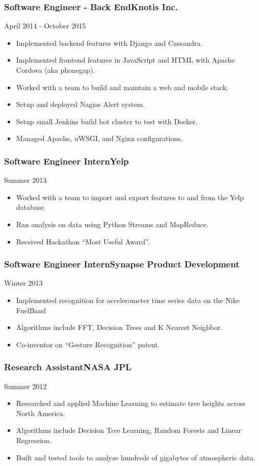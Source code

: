 \documentclass[9pt]{article}
\newenvironment{changemargin}[2]{%
  \begin{list}{}{%
    \setlength{\topsep}{0pt}%
    \setlength{\leftmargin}{#1}%
    \setlength{\rightmargin}{#2}%
    \setlength{\listparindent}{\parindent}%
    \setlength{\itemindent}{\parindent}%
    \setlength{\parsep}{\parskip}%
  }%
  \item[]}{\end{list}
}
\newenvironment{body} {
    \vspace*{-16pt}
    \begin{changemargin}{-0.20in}{-0.5in}
  }
    {\end{changemargin}
}
\newenvironment{jobdescriptionlist}[3]{
  \subsubsection*{#1\hfill\small#2}
  \small
  \vspace*{-5pt}
  {\hfill #3}
  \vspace*{-10pt}
  \begin{itemize}
   \setlength{\topsep}{0pt}
   \setlength{\itemsep}{1pt}
   \setlength{\parskip}{0pt}
   \setlength{\parsep}{0pt}
}{\end{itemize}\vspace*{-3pt}\normalsize}
\begin{document}
\begin{body}
    \begin{jobdescriptionlist}{Software Engineer - Back End}{Knotis Inc.}{April 2014 - October 2015}
        \item Implemented backend features with Django and Cassandra.
        \item Implemented frontend features in JavaScript and HTML with Apache Cordova (aka phonegap).
        \item Worked with a team to build and maintain a web and mobile stack.
        \item Setup and deployed Nagios Alert system.
        \item Setup small Jenkins build bot cluster to test with Docker.
        \item Managed Apache, uWSGI, and Nginx configurations.
    \end{jobdescriptionlist}

    \begin{jobdescriptionlist}{Software Engineer Intern}{Yelp}{Summer 2013}
        \item Worked with a team to import and export features to and from the Yelp database.
        \item Ran analysis on data using Python Streams and MapReduce.
        \item Received Hackathon ``Most Useful Award''.
    \end{jobdescriptionlist}

    \begin{jobdescriptionlist}{Software Engineer Intern}{Synapse Product Development}{Winter 2013}
        \item Implemented recognition for accelerometer time series data on the Nike FuelBand
        \item Algorithms include FFT, Decision Trees and K Nearest Neighbor.
        \item Co-inventor on ``Gesture Recognition'' patent.
    \end{jobdescriptionlist}

    \begin{jobdescriptionlist}{Research Assistant}{NASA JPL}{Summer 2012}
        \item Researched and applied Machine Learning to estimate tree heights across North America.
        \item Algorithms include Decision Tree Learning, Random Forests and Linear Regression.
        \item Built and tested tools to analyze hundreds of gigabytes of atmospheric data.
    \end{jobdescriptionlist}


\end{body}
\end{document}
